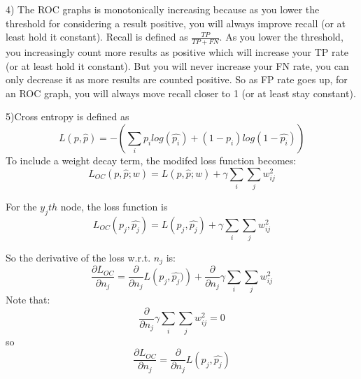 \documentclass[12pt]{article}
\begin{document}
4) The ROC graphs is monotonically increasing because as you lower the threshold for considering 
a result positive, you will always improve recall (or at least hold it constant). Recall is
defined as $\frac{TP}{TP+FN}$. As you lower the threshold, you increasingly count more 
results as positive which will increase your TP rate (or at least hold it constant). But you 
will never increase your FN rate, you can only decrease it as more results are counted positive. 
So as FP rate goes up, for an ROC graph, you will always move recall closer to 1 (or at least stay 
constant). 

\pagebreak
\setcounter{equation}{0}
5)Cross entropy is defined as 
\begin{equation}
    L(p,\hat{p}) = - \left( \sum_i p_i log\left(\hat{p_i}\right) + (1-p_i)log\left(1-\hat{p_i}\right)\right)
\end{equation}
To include a weight decay term, the modifed loss function becomes: 
\begin{equation}
    L_{OC}(p,\hat{p};w) = L(p,\hat{p};w) + \gamma\sum_i\sum_j w_{ij}^2
\end{equation}


For the $y_jth$ node, the loss function is
\begin{equation}
    L_{OC}(p_j,\hat{p_j}) = L\left(p_j,\hat{p_j}\right) + \gamma\sum_i\sum_j w_{ij}^2
\end{equation}

So the derivative of the loss w.r.t. $n_j$ is: 
\begin{equation}
    \frac{\partial L_{OC}}{\partial n_j} = \frac{\partial}{\partial n_j}L\left(p_j,\hat{p_j})\right)
    +\frac{\partial}{\partial n_j}\gamma\sum_i\sum_j w_{ij}^2 
\end{equation}
Note that: 
\begin{equation}
    \frac{\partial}{\partial n_j}\gamma\sum_i\sum_j w_{ij}^2 = 0 
\end{equation}
so 
\begin{equation}
    \frac{\partial L_{OC}}{\partial n_j} = \frac{\partial}{\partial n_j}L\left(p_j,\hat{p_j}\right)
\end{equation}
\end{document}
